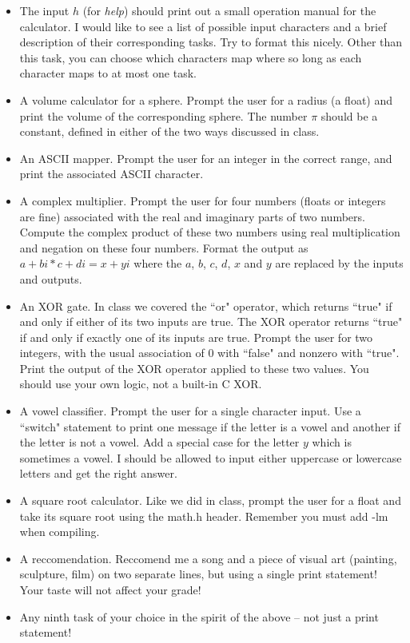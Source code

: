 \documentclass{article}
\begin{document}
\begin{itemize}
	\item The input $h$ (for \textit{help}) should print out a small operation manual for the calculator. I would like to see a list of possible input characters and a brief description of their corresponding tasks. Try to format this nicely. Other than this task, you can choose which characters map where so long as each character maps to at most one task.
	\item A volume calculator for a sphere. Prompt the user for a radius (a float) and print the volume of the corresponding sphere. The number $\pi$ should be a constant, defined in either of the two ways discussed in class.
	\item An ASCII mapper. Prompt the user for an integer in the correct range, and print the associated ASCII character.
	\item A complex multiplier. Prompt the user for four numbers (floats or integers are fine) associated with the real and imaginary parts of two numbers. Compute the complex product of these two numbers using real multiplication and negation on these four numbers. Format the output as $a + bi * c + di = x + yi$ where the $a$, $b$, $c$, $d$, $x$ and $y$ are replaced by the inputs and outputs.
	\item An XOR gate. In class we covered the ``or" operator, which returns ``true" if and only if either of its two inputs are true. The XOR operator returns ``true" if and only if exactly one of its inputs are true. Prompt the user for two integers, with the usual association of 0 with ``false" and nonzero with ``true". Print the output of the XOR operator applied to these two values. You should use your own logic, not a built-in C XOR.  
	\item A vowel classifier. Prompt the user for a single character input. Use a ``switch" statement to print  one message if the letter is a vowel and another if the letter is not a vowel. Add a special case for the letter $y$ which is sometimes a vowel. I should be allowed to input either uppercase or lowercase letters and get the right answer.
	\item A square root calculator. Like we did in class, prompt the user for a float and take its square root using the math.h header. Remember you must add -lm when compiling.
	\item A reccomendation. Reccomend me a song and a piece of visual art (painting, sculpture, film) on two separate lines, but using a single print statement! Your taste will not affect your grade!
	\item Any ninth task of your choice in the spirit of the above -- not just a print statement!

\end{itemize}
\end{document}
